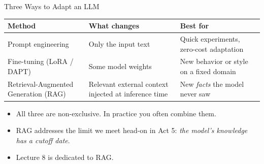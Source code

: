 \begin{frame}{Three Ways to Adapt an LLM}
\begin{center}
\renewcommand{\arraystretch}{1.35}
\begin{tabular}{p{3.2cm} p{4.2cm} p{4.5cm}}
\toprule
\textbf{Method} & \textbf{What changes} & \textbf{Best for} \\
\midrule
Prompt engineering & Only the input text & Quick experiments, zero-cost adaptation \\
Fine-tuning (LoRA / DAPT) & Some model weights & New behavior or style on a fixed domain \\
Retrieval-Augmented Generation (RAG) & Relevant external context injected at inference time & New \emph{facts} the model never saw \\
\bottomrule
\end{tabular}
\end{center}

\medskip
\begin{itemize}
\item All three are non-exclusive. In practice you often combine them.
\item RAG addresses the limit we meet head-on in Act 5: \emph{the model's knowledge has a cutoff date}.
\item Lecture 8 is dedicated to RAG.
\end{itemize}
\end{frame}

